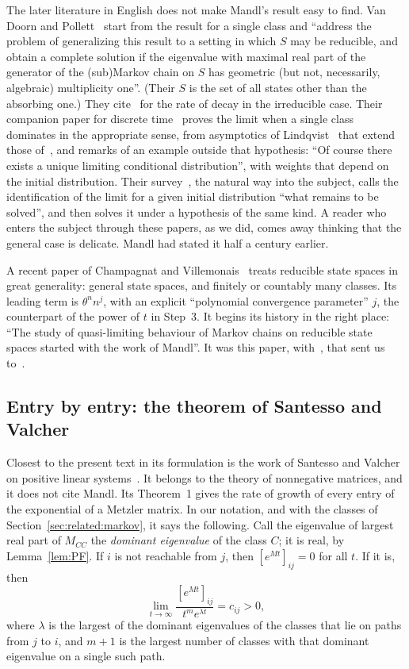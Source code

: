 \documentclass[11pt]{article}
\theoremstyle{definition}
\theoremstyle{remark}
\begin{document}
The later literature in English does not make Mandl's result easy to find. Van Doorn and
Pollett~\cite{vDP08} start from the result for a single class and ``address the problem of
generalizing this result to a setting in which $S$ may be reducible, and obtain a complete
solution if the eigenvalue with maximal real part of the generator of the (sub)Markov chain on
$S$ has geometric (but not, necessarily, algebraic) multiplicity one''. (Their $S$ is the set of
all states other than the absorbing one.) They cite~\cite{Mandl60} for the rate of decay in the
irreducible case. Their companion paper for discrete time~\cite{vDP09} proves the limit when a
single class dominates in the appropriate sense, from asymptotics of
Lindqvist~\cite{Lindqvist} that extend those of~\cite{Mandl59}, and remarks of an example
outside that hypothesis: ``Of course there exists a unique limiting conditional distribution'',
with weights that depend on the initial distribution. Their survey~\cite{vDP13}, the natural way into the
subject, calls the identification of the limit for a given initial distribution ``what remains
to be solved'', and then solves it under a hypothesis of the same kind. A reader who enters the
subject through these papers, as we did, comes away thinking that the general case is delicate.
Mandl had stated it half a century earlier.

A recent paper of Champagnat and Villemonais~\cite{CV} treats reducible state spaces in great
generality: general state spaces, and finitely or countably many classes. Its leading term is
$\theta^{n} n^{j}$, with an explicit ``polynomial convergence parameter'' $j$, the counterpart of
the power of $t$ in Step~3. It begins its history in the right place: ``The study of
quasi-limiting behaviour of Markov chains on reducible state spaces started with the work of
Mandl''. It was this paper, with~\cite{vDP09}, that sent us to~\cite{Mandl59,Mandl60}.

\subsection{Entry by entry: the theorem of Santesso and Valcher}\label{sec:related:sv}

Closest to the present text in its formulation is the work of Santesso and Valcher on positive
linear systems~\cite{SV07}. It belongs to the theory of nonnegative matrices, and it does not
cite Mandl. Its Theorem~1 gives the rate of growth of every entry of the exponential of a
Metzler matrix. In our notation, and with the classes of Section~\ref{sec:related:markov}, it
says the following. Call the eigenvalue of largest real part of $M_{CC}$ the \emph{dominant
eigenvalue} of the class $C$; it is real, by Lemma~\ref{lem:PF}. If $i$ is not reachable from
$j$, then $[e^{Mt}]_{ij} = 0$ for all $t$. If it is, then
\begin{equation}\label{eq:SV}
  \lim_{t\to\infty} \frac{[e^{Mt}]_{ij}}{t^{m} e^{\lambda t}} = c_{ij} > 0 ,
\end{equation}
where $\lambda$ is the largest of the dominant eigenvalues of the classes that lie on paths from
$j$ to $i$, and $m + 1$ is the largest number of classes with that dominant eigenvalue on a
single such path.
\end{document}
